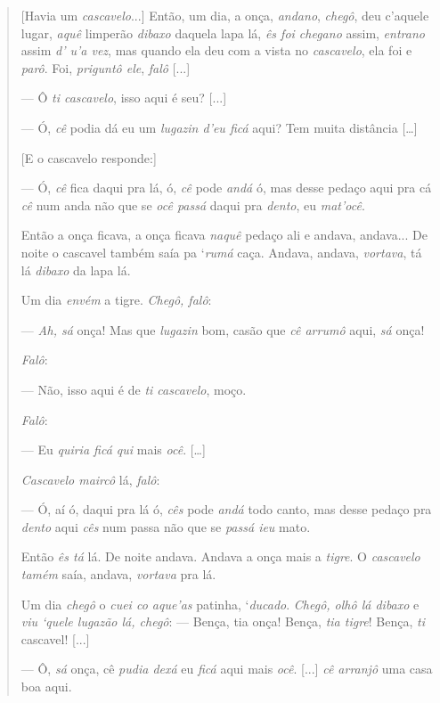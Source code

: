 \documentclass[portuguese]{textolivre}
\begin{document}
\begin{quote}
    [Havia um \textit{cascavelo}...] Então, um dia, a onça, \textit{andano}, \textit{chegô}, deu c’aquele lugar, \textit{aquê} limperão \textit{dibaxo} daquela lapa lá, \textit{ês foi chegano} assim, \textit{entrano} assim \textit{d’ u’a vez}, mas quando ela deu com a vista no \textit{cascavelo}, ela foi e \textit{parô}. Foi, \textit{priguntô ele}, \textit{falô} [...]
    
— Ô \textit{ti cascavelo}, isso aqui é seu? [...]

— Ó, \textit{cê} podia dá eu um \textit{lugazin d’eu ficá} aqui? Tem muita distância […]

[E o cascavelo responde:] 

— Ó, \textit{cê} fica daqui pra lá, ó, \textit{cê} pode \textit{andá} ó, mas desse pedaço aqui pra cá \textit{cê} num anda não que se \textit{ocê passá} daqui pra \textit{dento}, eu \textit{mat’ocê}.

Então a onça ficava, a onça ficava \textit{naquê} pedaço ali e andava, andava... De noite o cascavel também saía pa ‘\textit{rumá} caça. Andava, andava, \textit{vortava}, tá lá \textit{dibaxo} da lapa lá.

Um dia \textit{envém} a tigre. \textit{Chegô, falô}:

— \textit{Ah, sá} onça! Mas que \textit{lugazin} bom, casão que \textit{cê arrumô} aqui, \textit{sá} onça! 

\textit{Falô}:

— Não, isso aqui é de \textit{ti cascavelo}, moço. 

\textit{Falô}:

— Eu \textit{quiria ficá qui} mais \textit{ocê}. […]

\textit{Cascavelo maircô} lá, \textit{falô}:

— Ó, aí ó, daqui pra lá ó, \textit{cês} pode \textit{andá} todo canto, mas desse pedaço pra \textit{dento} aqui \textit{cês} num passa não que se \textit{passá ieu} mato.

Então \textit{ês tá} lá. De noite andava. Andava a onça mais a \textit{tigre}. O \textit{cascavelo tamém} saía, andava, \textit{vortava} pra lá.

Um dia \textit{chegô} o \textit{cuei co aque’as} patinha, ‘\textit{ducado}. \textit{Chegô, olhô lá dibaxo} e \textit{viu ‘quele lugazão lá, chegô}: — Bença, tia onça! Bença, \textit{tia tigre}! Bença, \textit{ti} cascavel! [...]

— Ô, \textit{sá} onça, cê \textit{pudia dexá} eu \textit{ficá} aqui mais \textit{ocê}. [...] \textit{cê arranjô} uma casa boa aqui.


\end{quote}
\end{document}
